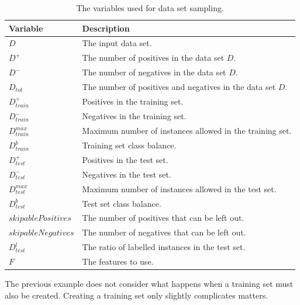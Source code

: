 \documentclass[twoside,a4paper]{refart}
\begin{document}
\begin{table}[htp]
\centering
    \begin{tabular}{|l|l|}
    \hline
    Variable & Description \\ \hline
    $D$        & The input data set.           \\[1ex]
    $D^{+}$        & The number of positives in the data set $D$.           \\[1ex]
    $D^{-}$        & The number of negatives in the data set $D$.           \\[1ex]
    $D_{tot}$        & The number of positives and negatives in the data set $D$.           \\[1ex]
    $D_{train}^{+}$        & Positives in the training set.           \\[1ex]
    $D_{train}^{-}$        & Negatives in the training set.           \\[1ex]
    $D_{train}^{max}$        & Maximum number of instances allowed in the training set.           \\[1ex]
    $D_{train}^{b}$        & Training set class balance.           \\[1ex]
    $D_{test}^{+}$        & Positives in the test set.           \\[1ex]
    $D_{test}^{-}$        & Negatives in the test set.           \\[1ex]
    $D_{test}^{max}$        & Maximum number of instances allowed in the test set.           \\[1ex]
    $D_{test}^{b}$        & Test set class balance.           \\[1ex]
    $skipablePositives$        & The number of positives that can be left out.           \\[1ex]
    $skipableNegatives$        &  The number of negatives that can be left out.          \\[1ex]
    $D_{test}^{l}$                   & The ratio of labelled instances in the test set. \\[1ex]
    $F$                   & The features to use. \\\hline
    \end{tabular}
    \caption[The primary variables used for data set sampling.]{The variables used for data set sampling.}
\label{tab:vars}
\end{table}

The previous example does not consider what happens when a training set must also be created. Creating a training set only slightly complicates matters. 
\end{document}

